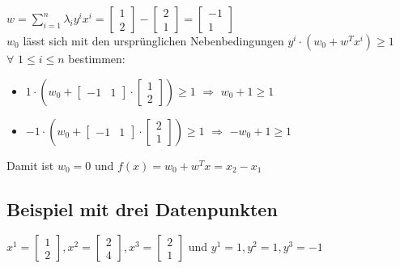 \documentclass{report}
\begin{document}
  $w = \sum_{i=1}^n\lambda_iy^ix^i = \begin{bmatrix}1\\2\end{bmatrix} - \begin{bmatrix}2\\1\end{bmatrix} =	
  \begin{bmatrix}-1\\1\end{bmatrix}$\\	
  $w_0$ lässt sich mit den ursprünglichen Nebenbedingungen $y^i\cdot(w_0 + w^Tx^i)\geq 1$\\	
  $\forall$ $1\leq i\leq n$ bestimmen:\\	
  \vspace*{-1.5em}	
  \begin{itemize}	
    \item $1\cdot(w_0 + \begin{bmatrix}-1&1\end{bmatrix}\cdot\begin{bmatrix}1\\2\end{bmatrix}) \geq 1$ $\Rightarrow$ $w_0 + 1\geq 1$	
    \item $-1\cdot(w_0 + \begin{bmatrix}-1&1\end{bmatrix}\cdot\begin{bmatrix}2\\1\end{bmatrix}) \geq 1$ $\Rightarrow$ $-w_0 + 1\geq 1$	
  \end{itemize}	
  Damit ist $w_0 = 0$ und $f(x) = w_0 + w^Tx = x_2 - x_1$	
  
  \subsection{Beispiel mit drei Datenpunkten}	
  $x^1 = \begin{bmatrix}1\\2\end{bmatrix}, x^2 = \begin{bmatrix}2\\4\end{bmatrix}, x^3 = \begin{bmatrix}2\\1\end{bmatrix}$	
  und $y^1 = 1, y^2 = 1, y^3 = -1$	
  
\end{document}
